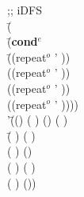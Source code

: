     \begin{ZZZZschemedisplay}%
;; iDFS\\%
\va{$\gt$} \=(  \\%
  \>\PRN \HL \=(\textbf{cond$^e$}\\%
  \>  \>\PRN \HL \=((repeat$^o$ ' ))\\%
  \>  \>  \>((repeat$^o$ ' ))\\%
  \>  \>  \>((repeat$^o$ ' ))\\%
  \>  \>  \>((repeat$^o$ ' ))))\\%
'\=(() ( ) () (  )\\%
 \>\PRN \=(   ) ( )\\%
 \> \>(    ) ()\\%
 \> \>(     ) (  )\\%
 \> \>(      ) ())%
\end{ZZZZschemedisplay}
    